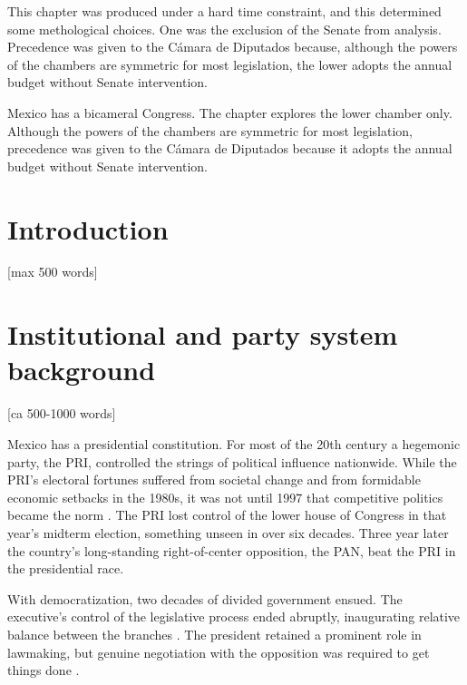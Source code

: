 \documentclass[letter,12pt]{article}
\begin{document}
This chapter was produced under a hard time constraint, and this determined some methological choices. One was the exclusion of the Senate from analysis. Precedence was given to the Cámara de Diputados because, although the powers of the chambers are symmetric for most legislation, the lower adopts the annual budget without Senate intervention. 

Mexico has a bicameral Congress. The chapter explores the lower chamber only. Although the powers of the chambers are symmetric for most legislation, precedence was given to the Cámara de Diputados because it adopts the annual budget without Senate intervention. 


\section{Introduction} [max 500 words]

\section{Institutional and party system background} [ca 500-1000 words]

Mexico has a presidential constitution. For most of the 20th century a hegemonic party, the PRI, controlled the strings of political influence nationwide. While the PRI's electoral fortunes suffered from societal change and from formidable economic setbacks in the 1980s, it was not until 1997 that competitive politics became the norm \citep{cosio.villegas.1981,molinar.1991a,cornelius.1996}. The PRI lost control of the lower house of Congress in that year's midterm election, something unseen in over six decades. Three year later the country's long-standing right-of-center opposition, the PAN, beat the PRI in the presidential race. 


With democratization, two decades of divided government ensued. The executive's control of the legislative process ended abruptly, inaugurating relative balance between the branches \citep{weldon.1997,lujambio.segl.2000}. The president retained a prominent role in lawmaking, but genuine negotiation with the opposition was required to get things done \citep{casarSinMay2013,bejarQuienLegisla2012}. 
\end{document}
